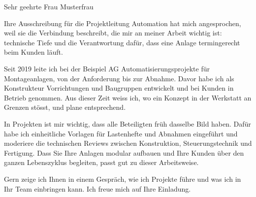 \documentclass[brief,de,rueckgrat,v2,schmal,duenn,ohnepfeil,rand15,ruhig,schluesselspalte,name25,briefkopf,betreffrubrik,beilagengruss,ohnefenster,luft]{rueckgrat}
\begin{document}
\cvletterhead

\cvletterbody


\begin{cvletter}
Sehr geehrte Frau Musterfrau

Ihre Ausschreibung für die Projektleitung Automation hat mich angesprochen, weil sie die Verbindung beschreibt, die mir an meiner Arbeit wichtig ist: technische Tiefe und die Verantwortung dafür, dass eine Anlage termingerecht beim Kunden läuft.

Seit 2019 leite ich bei der Beispiel AG Automatisierungsprojekte für Montageanlagen, von der Anforderung bis zur Abnahme. Davor habe ich als Konstrukteur Vorrichtungen und Baugruppen entwickelt und bei Kunden in Betrieb genommen. Aus dieser Zeit weiss ich, wo ein Konzept in der Werkstatt an Grenzen stösst, und plane entsprechend.

In Projekten ist mir wichtig, dass alle Beteiligten früh dasselbe Bild haben. Dafür habe ich einheitliche Vorlagen für Lastenhefte und Abnahmen eingeführt und moderiere die technischen Reviews zwischen Konstruktion, Steuerungstechnik und Fertigung. Dass Sie Ihre Anlagen modular aufbauen und Ihre Kunden über den ganzen Lebenszyklus begleiten, passt gut zu dieser Arbeitsweise.

Gern zeige ich Ihnen in einem Gespräch, wie ich Projekte führe und was ich in Ihr Team einbringen kann. Ich freue mich auf Ihre Einladung.

\end{cvletter}

\end{document}
